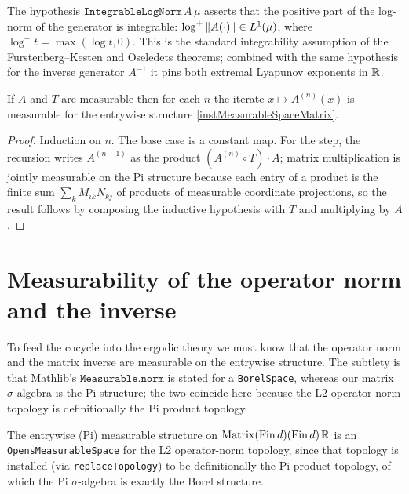 \begin{definition}\label{IntegrableLogNorm}
  \leanok
  The hypothesis \(\texttt{IntegrableLogNorm}\,A\,\mu\) asserts that the positive part of
  the log-norm of the generator is integrable: \(\log^{+}\left\lVert A(\cdot) \right\rVert \in L^{1}(\mu)\),
  where \(\log^{+} t = \max(\log t, 0)\). This is the standard integrability assumption of
  the Furstenberg--Kesten and Oseledets theorems; combined with the same hypothesis for
  the inverse generator \(A^{-1}\) it pins both extremal Lyapunov exponents in \(\mathbb{R}\).
\end{definition}

\begin{theorem}\label{measurable_cocycle}
  \leanok
  If \(A\) and \(T\) are measurable then for each \(n\) the iterate
  \(x \mapsto A^{(n)}(x)\) is measurable for the entrywise structure
  \ref{instMeasurableSpaceMatrix}.
\end{theorem}
\begin{proof}\leanok
  Induction on \(n\). The base case is a constant map. For the step, the recursion writes
  \(A^{(n+1)}\) as the product \((A^{(n)}\circ T)\cdot A\); matrix multiplication is jointly
  measurable on the Pi structure because each entry of a product is the finite sum
  \(\sum_k M_{ik}N_{kj}\) of products of measurable coordinate projections, so the result
  follows by composing the inductive hypothesis with \(T\) and multiplying by \(A\).
\end{proof}

\section{Measurability of the operator norm and the inverse}

To feed the cocycle into the ergodic theory we must know that the operator norm and the
matrix inverse are measurable on the entrywise structure. The subtlety is that Mathlib's
\(\texttt{Measurable.norm}\) is stated for a \texttt{BorelSpace}, whereas our matrix
\(\sigma\)-algebra is the Pi structure; the two coincide here because the L2
operator-norm topology is definitionally the Pi product topology.

\begin{lemma}\label{instOpensMeasurableSpaceMatrix}
  \leanok
  The entrywise (Pi) measurable structure on \(\operatorname{Matrix}(\operatorname{Fin} d)(\operatorname{Fin} d)\,\mathbb{R}\) is an
  \texttt{OpensMeasurableSpace} for the L2 operator-norm topology, since that topology is
  installed (via \texttt{replaceTopology}) to be definitionally the Pi product topology, of
  which the Pi \(\sigma\)-algebra is exactly the Borel structure.
\end{lemma}

